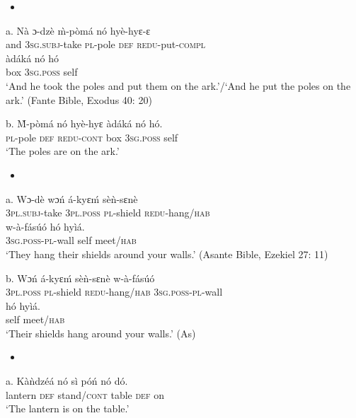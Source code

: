 \documentclass[output=paper]{langsci/langscibook}
\begin{document}
\begin{itemize}
\item \end{itemize}
\gll a.  N\`{a}  ɔ{}-dz\`{e}     \`{m}-p\`{o}m\'{a}   n\'{o}  hy\`{e}-hyɛ-ɛ \\
             and  \textsc{3sg.subj}{}-take  \textsc{pl}{}-pole    \textsc{def}  \textsc{redu}{}-put-\textsc{compl}  \\
\gll   \`{a}d\'{a}k\'{a}     n\'{o}    h\'{o}  \\
       box    \textsc{3sg.poss}  self  \\
\glt    ‘And he took the poles and put them on the ark.’/‘And he put the poles on the ark.’ (Fante Bible, Exodus 40: 20)
\z

\gll  b.  \`{M}-p\`{o}m\'{a}   n\'{o}   hy\`{e}-hyɛ   \`{a}d\'{a}k\'{a}  n\'{o}    h\'{o}.\\
       \textsc{pl}{}-pole    \textsc{def}  \textsc{redu-cont}  box  \textsc{3sg.poss}  self  \\
\glt   ‘The poles are on the ark.’
\z

\begin{itemize}
\item \end{itemize}
\gll a.   Wɔ-d\`{e}    wɔ\'{n}    \'{a}-kyɛ\'{m}   s\`{e}\`{n}-sɛn\`{e} \\
       \textsc{3pl.subj}{}-take  \textsc{3pl.poss}  \textsc{pl}{}-shield  \textsc{redu}{}-hang/\textsc{hab}\\
\gll   w-\`{a}-f\'{a}s\'{u}\'{o}    h\'{o}   hy\`{i}\'{a}.    \\
       \textsc{3sg.poss-pl}{}-wall  self  meet/\textsc{hab}  \\
\glt ‘They hang their shields around your walls.’ (Asante Bible, Ezekiel 27: 11)
\z

\gll  b.  Wɔ\'{n}    \'{a}-kyɛ\'{m}    s\`{e}\`{n}-sɛn\`{e}     w-\`{a}-f\'{a}s\'{u}\'{o} \\
       \textsc{3pl.poss}  \textsc{pl}{}-shield  \textsc{redu}{}-hang/\textsc{hab}  \textsc{3sg.poss-pl}{}-wall\\
\gll   h\'{o}  hy\`{i}\'{a}.\\
       self  meet/\textsc{hab}\\
\glt ‘Their shields hang around your walls.’ (As)
\z

\begin{itemize}
\item \end{itemize}
\gll a.  K\`{a}\`{n}dz\'{e}\'{a}  n\'{o}  s\`{i}    p\'{o}\'{n}  n\'{o}  d\'{o}.\\
       lantern    \textsc{def}  stand/\textsc{cont}  table  \textsc{def}  on\\
\glt ‘The lantern is on the table.’
\z
\end{document}
